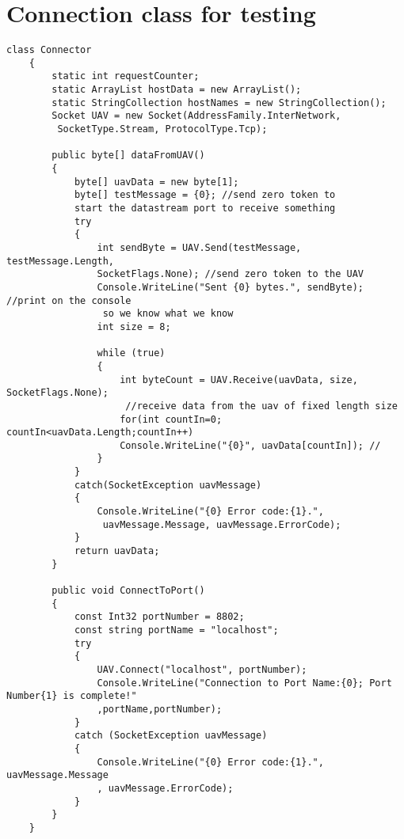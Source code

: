 
\lstset{numbers=left,
numberstyle=\footnotesize, 
stepnumber=2,numbersep=5pt}
\section{Connection class for testing}

\begin{lstlisting}[caption=\texttt{Connector} for testing with console application,label=appen:connectorTest]
    class Connector
    {
        static int requestCounter;
        static ArrayList hostData = new ArrayList();
        static StringCollection hostNames = new StringCollection();
        Socket UAV = new Socket(AddressFamily.InterNetwork,
         SocketType.Stream, ProtocolType.Tcp);

        public byte[] dataFromUAV()
        {
            byte[] uavData = new byte[1];
            byte[] testMessage = {0}; //send zero token to 
            start the datastream port to receive something
            try
            {
                int sendByte = UAV.Send(testMessage, testMessage.Length, 
                SocketFlags.None); //send zero token to the UAV
                Console.WriteLine("Sent {0} bytes.", sendByte); //print on the console
                 so we know what we know
                int size = 8;

                while (true)
                {
                    int byteCount = UAV.Receive(uavData, size, SocketFlags.None);
                     //receive data from the uav of fixed length size
                    for(int countIn=0; countIn<uavData.Length;countIn++)
                    Console.WriteLine("{0}", uavData[countIn]); //
                }
            }
            catch(SocketException uavMessage)
            {
                Console.WriteLine("{0} Error code:{1}.",
                 uavMessage.Message, uavMessage.ErrorCode);
            }
            return uavData;
        }

        public void ConnectToPort()
        {
            const Int32 portNumber = 8802;
            const string portName = "localhost";
            try
            {
                UAV.Connect("localhost", portNumber);
                Console.WriteLine("Connection to Port Name:{0}; Port Number{1} is complete!"
                ,portName,portNumber);
            }
            catch (SocketException uavMessage)
            {
                Console.WriteLine("{0} Error code:{1}.", uavMessage.Message
                , uavMessage.ErrorCode);
            }
        }
    }

\end{lstlisting}
